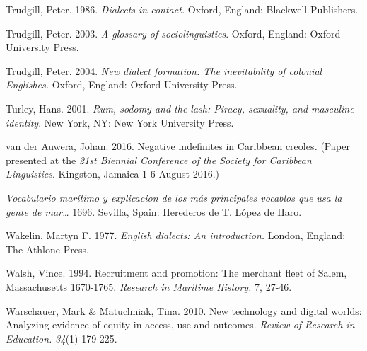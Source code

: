 \begin{styleStandard}
Trudgill, Peter. 1986. \textit{Dialects in contact.} Oxford, England: Blackwell Publishers.
\end{styleStandard}

\begin{styleStandard}
Trudgill, Peter. 2003. \textit{A glossary of sociolinguistics}. Oxford, England: Oxford University Press.
\end{styleStandard}

\begin{styleStandard}
Trudgill, Peter. 2004. \textit{New dialect formation: The inevitability of colonial Englishes.} Oxford, England: Oxford University Press.
\end{styleStandard}

\begin{styleStandard}
Turley, Hans. 2001. \textit{Rum, sodomy and the lash: Piracy, sexuality, and masculine identity}. New York, NY: New York University Press. 
\end{styleStandard}

\begin{styleStandard}
van der Auwera, Johan. 2016. Negative indefinites in Caribbean creoles\textit{. }(Paper presented at the \textit{21st Biennial Conference of the Society for Caribbean Linguistics}. Kingston, Jamaica 1-6 August 2016.) 
\end{styleStandard}

\begin{styleStandard}
\textit{Vocabulario marítimo y explicacion de los más principales vocablos que usa la gente de mar…} 1696. Sevilla, Spain: Herederos de T. López de Haro. 
\end{styleStandard}

\begin{styleStandard}
Wakelin, Martyn F. 1977. \textit{English dialects: An introduction.} London, England: The Athlone Press.
\end{styleStandard}

\begin{styleStandard}
Walsh, Vince. 1994. Recruitment and promotion: The merchant fleet of Salem, Massachusetts 1670-1765. \textit{Research in Maritime History. }7, 27-46. 
\end{styleStandard}

\begin{styleStandard}
Warschauer, Mark \& Matuchniak, Tina. 2010. New technology and digital worlds: Analyzing evidence of equity in access, use and outcomes. \textit{Review of Research in Education. 34}(1) 179-225. \ 
\end{styleStandard}

